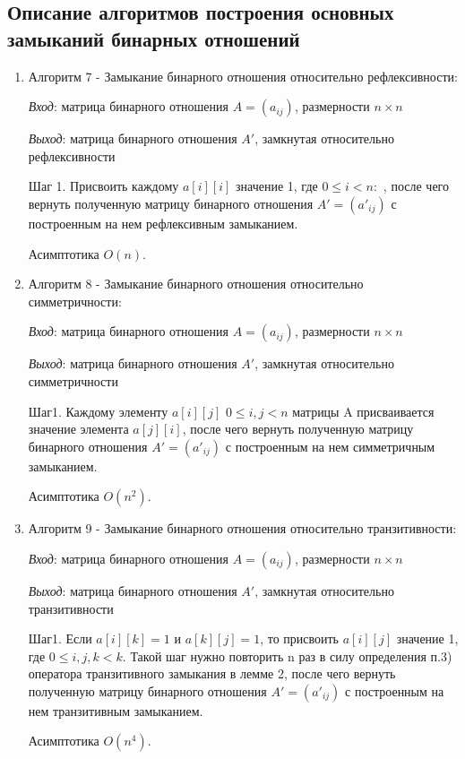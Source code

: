 \documentclass[spec, och, labwork]{shiza}
\begin{document}
        \subsection{Описание алгоритмов построения основных замыканий бинарных отношений}
            \begin{enumerate}
                
                \item Алгоритм 7 - Замыкание бинарного отношения относительно рефлексивности:
                
                \textit{Вход}: матрица бинарного отношения $A = (a_{ij})$, размерности $n \times n$

                \textit{Выход}: матрица бинарного отношения $A'$, замкнутая относительно рефлексивности

                Шаг 1. Присвоить каждому $a[i][i]$ значение 1, где $0 \leq i < n:$ , после чего вернуть полученную матрицу бинарного отношения $A'=(a'_{ij})$ с построенным на нем рефлексивным замыканием.

                Асимптотика $O(n)$.

                \item Алгоритм 8 - Замыкание бинарного отношения относительно симметричности:
                
                \textit{Вход}: матрица бинарного отношения $A = (a_{ij})$, размерности $n \times n$

                \textit{Выход}: матрица бинарного отношения $A'$, замкнутая относительно симметричности

                Шаг1. Каждому элементу $a[i][j]$ $0 \leq i, j < n$ матрицы A присваивается значение элемента
                $a[j][i]$, после чего вернуть полученную матрицу бинарного отношения $A'=(a'_{ij})$ с построенным на нем симметричным замыканием.

                Асимптотика $O(n^2)$.

                \item Алгоритм 9 - Замыкание бинарного отношения относительно транзитивности:
                
                \textit{Вход}: матрица бинарного отношения $A = (a_{ij})$, размерности $n \times n$

                \textit{Выход}: матрица бинарного отношения $A'$, замкнутая относительно транзитивности

                Шаг1. Если $a[i][k] = 1$ и $a[k][j] = 1$, то присвоить $a[i][j]$ значение 1, где $0 \leq i,j,k < k$. Такой шаг нужно повторить n раз
                в силу определения п.3) оператора транзитивного замыкания в лемме 2, после чего вернуть полученную матрицу бинарного отношения $A'=(a'_{ij})$ с построенным на нем транзитивным замыканием.

                Асимптотика $O(n^4)$.
            \end{enumerate}
    
\end{document}
